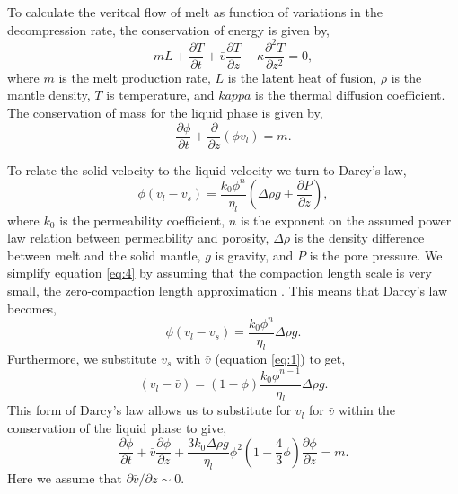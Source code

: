 \documentclass[a4paper,11pt,onecolumn]{article}
\begin{document}
To calculate the veritcal flow of melt as function of variations in the decompression rate, the conservation of energy is given by,
\begin{equation}
mL + \frac{\partial T}{\partial t} + \bar{v}\frac{\partial T}{\partial z} - \kappa\frac{\partial^{2} T}{\partial z^{2}} = 0,
\label{eq:2}
\end{equation}
where $m$ is the melt production rate, $L$ is the latent heat of fusion, $\rho$ is the mantle density, $T$ is temperature, and $kappa$ is the thermal diffusion coefficient. The conservation of mass for the liquid phase is given by,
\begin{equation}
\frac{\partial \phi}{\partial t} + \frac{\partial}{\partial z}\left(\phi v_{l}\right) = m.
\label{eq:3}
\end{equation}

To relate the solid velocity to the liquid velocity we turn to Darcy's law,
\begin{equation}
\phi\left(v_{l}-v_{s}\right) = \frac{k_{0}\phi^{n}}{\eta_{l}}\left(\Delta\rho g + \frac{\partial P}{\partial z}\right),
\label{eq:4}
\end{equation}
where $k_{0}$ is the permeability coefficient, $n$ is the exponent on the assumed power law relation between permeability and porosity, $\Delta\rho$ is the density difference between melt and the solid mantle, $g$ is gravity, and $P$ is the pore pressure. We simplify equation \ref{eq:4} by assuming that the compaction length scale is very small, the zero-compaction length approximation \cite{ribe-1985}. This means that Darcy's law becomes,
\begin{equation}
\phi\left(v_{l}-v_{s}\right) = \frac{k_{0}\phi^{n}}{\eta_{l}} \Delta\rho g.
\label{eq:5}
\end{equation}
Furthermore, we substitute $v_{s}$ with $\bar{v}$ (equation \ref{eq:1}) to get,
\begin{equation}
\left(v_{l}-\bar{v}\right) = \left(1-\phi\right)\frac{k_{0}\phi^{n-1}}{\eta_{l}} \Delta\rho g.
\label{eq:6}
\end{equation}
This form of Darcy's law allows us to substitute for $v_{l}$ for $\bar{v}$ within the conservation of the liquid phase to give,
\begin{equation}
\frac{\partial \phi}{\partial t} + \bar{v} \frac{\partial \phi}{\partial z} + \frac{3k_{0}\Delta\rho g}{\eta_{l}} \phi^{2}\left(1-\frac{4}{3}\phi\right)\frac{\partial \phi}{\partial z} = m.
\label{eq:7}
\end{equation}
Here we assume that $\partial\bar{v}/\partial z \sim 0$.
\end{document}
